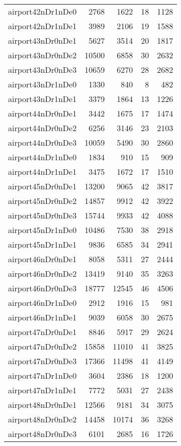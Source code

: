 \begin{tabular}{lrrrr}
airport42nDr1nDe0 & 2768 & 1622 & 18 & 1128 \\
airport42nDr1nDe1 & 3989 & 2106 & 19 & 1588 \\
airport43nDr0nDe1 & 5627 & 3514 & 20 & 1817 \\
airport43nDr0nDe2 & 10500 & 6858 & 30 & 2632 \\
airport43nDr0nDe3 & 10659 & 6270 & 28 & 2682 \\
airport43nDr1nDe0 & 1330 & 840 & 8 & 482 \\
airport43nDr1nDe1 & 3379 & 1864 & 13 & 1226 \\
airport44nDr0nDe1 & 3442 & 1675 & 17 & 1474 \\
airport44nDr0nDe2 & 6256 & 3146 & 23 & 2103 \\
airport44nDr0nDe3 & 10059 & 5490 & 30 & 2860 \\
airport44nDr1nDe0 & 1834 & 910 & 15 & 909 \\
airport44nDr1nDe1 & 3475 & 1672 & 17 & 1510 \\
airport45nDr0nDe1 & 13200 & 9065 & 42 & 3817 \\
airport45nDr0nDe2 & 14857 & 9912 & 42 & 3922 \\
airport45nDr0nDe3 & 15744 & 9933 & 42 & 4088 \\
airport45nDr1nDe0 & 10486 & 7530 & 38 & 2918 \\
airport45nDr1nDe1 & 9836 & 6585 & 34 & 2941 \\
airport46nDr0nDe1 & 8058 & 5311 & 27 & 2444 \\
airport46nDr0nDe2 & 13419 & 9140 & 35 & 3263 \\
airport46nDr0nDe3 & 18777 & 12545 & 46 & 4506 \\
airport46nDr1nDe0 & 2912 & 1916 & 15 & 981 \\
airport46nDr1nDe1 & 9039 & 6058 & 30 & 2675 \\
airport47nDr0nDe1 & 8846 & 5917 & 29 & 2624 \\
airport47nDr0nDe2 & 15858 & 11010 & 41 & 3825 \\
airport47nDr0nDe3 & 17366 & 11498 & 41 & 4149 \\
airport47nDr1nDe0 & 3604 & 2386 & 18 & 1200 \\
airport47nDr1nDe1 & 7772 & 5031 & 27 & 2438 \\
airport48nDr0nDe1 & 12566 & 9181 & 34 & 3075 \\
airport48nDr0nDe2 & 14458 & 10174 & 36 & 3268 \\
airport48nDr0nDe3 & 6101 & 2685 & 16 & 1726 \\

\end{tabular}
